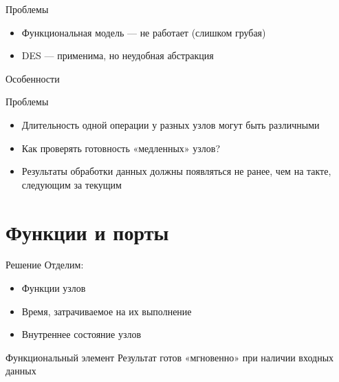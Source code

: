 \begin{frame}{Проблемы}
\begin{itemize}
    \item Функциональная модель — не работает (слишком грубая)
    \item DES — применима, но неудобная абстракция
\end{itemize}


\end{frame}

\begin{frame}{Особенности}

\end{frame}

\begin{frame}{Проблемы}
\begin{itemize}
\item Длительность одной операции у разных узлов могут быть различными
\item Как проверять готовность «медленных» узлов?
\item Результаты обработки данных должны появляться не ранее, чем на такте, следующим за текущим
\end{itemize}

\end{frame}

\section{Функции и порты}

\begin{frame}{Решение}
Отделим:
    \begin{itemize}
    \item Функции узлов
    \item Время, затрачиваемое на их выполнение
    \item Внутреннее состояние узлов
    \end{itemize}
\end{frame}

\begin{frame}{Функциональный элемент}
Результат готов «мгновенно» при наличии входных данных

\vfill
\centering
{}

\end{frame}

